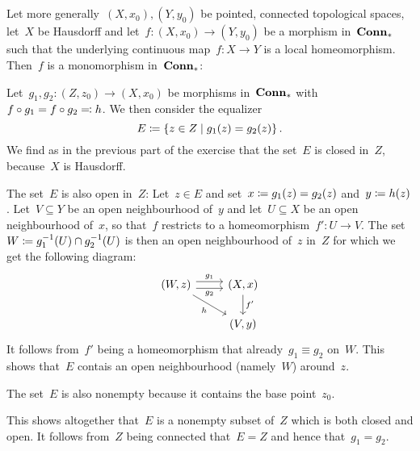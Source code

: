 \subsection{}

Let more generally~$(X,x_0), (Y,y_0)$ be pointed, connected topological spaces, let~$X$ be Hausdorff and let~$f \colon (X,x_0) \to (Y,y_0)$ be a morphism in~$\mathbf{Conn}_*$ such that the underlying continuous map~$f \colon X \to Y$ is a local homeomorphism.
Then~$f$ is a monomorphism in~$\mathbf{Conn}_*$:

Let~$g_1, g_2 \colon (Z,z_0) \to (X,x_0)$ be morphisms in~$\mathbf{Conn}_*$ with~$f \circ g_1 = f \circ g_2 \eqqcolon h$.
We then consider the equalizer
\[
            E
  \defined  \{
              z \in Z
            \suchthat
              g_1(z) = g_2(z)
            \} \,.
\]
We find as in the previous part of the exercise that the set~$E$ is closed in~$Z$, because~$X$ is Hausdorff.

The set~$E$ is also open in~$Z$:
Let~$z \in E$ and set~$x \coloneqq g_1(z) = g_2(z)$ and~$y \coloneqq h(z)$.
Let~$V \subseteq Y$ be an open neighbourhood of~$y$ and let~$U \subseteq X$ be an open neighbourhood of~$x$, so that~$f$ restricts to a homeomorphism~$f' \colon U \to V$.
The set~$W \coloneqq g_1^{-1}(U) \cap g_2^{-1}(U)$ is then an open neighbourhood of~$z$ in~$Z$ for which we get the following diagram:
\[
  \begin{tikzcd}
      (W,z)
      \arrow[yshift=0.3em]{r}[above]{g_1}
      \arrow[yshift=-0.3em]{r}[below]{g_2}
      \arrow{dr}[below left]{h}
    & (X,x)
      \arrow{d}[right]{f'}
    \\
      {}
    & (V,y)
  \end{tikzcd}
\]
It follows from~$f'$ being a homeomorphism that already~$g_1 \equiv g_2$ on~$W$.
This shows that~$E$ contais an open neighbourhood (namely~$W$) around~$z$.

The set~$E$ is also nonempty because it contains the base point~$z_0$.

This shows altogether that~$E$ is a nonempty subset of~$Z$ which is both closed and open.
It follows from~$Z$ being connected that~$E = Z$ and hence that~$g_1 = g_2$.






